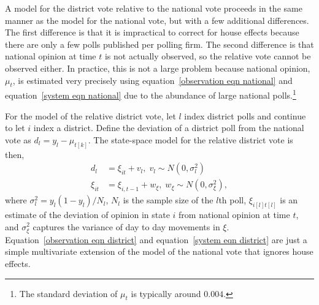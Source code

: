 \documentclass[12pt,final,fleqn]{article}
\theoremstyle{plain}
\begin{document}
A model for the district vote relative to the national vote proceeds in the same manner as the model for the national vote, but with a few additional differences. The first difference is that it is impractical to correct for house effects because there are only a few polls published per polling firm. The second difference is that national opinion at time $t$ is not actually observed, so the relative vote cannot be observed either. In practice, this is not a large problem because national opinion, $\mu_t$, is estimated very precisely using equation~\ref{observation eqn national} and equation~\ref{system eqn national} due to the abundance of large national polls.\footnote{The standard deviation of $\mu_t$ is typically around $0.004$.}

For the model of the relative district vote, let $l$ index district polls and continue to let $i$ index a district. Define the deviation of a district poll from the national vote as $d_l = y_l - \mu_{t[k]}$. The state-space model for the relative district vote is then,
\begin{align}
\label{observation eqn district}
d_l &= \xi_{it} + v_l, \; v_l\sim N(0, \sigma^2_l)\\ 
\label{system eqn district}
\xi_{it} &= \xi_{i,t-1} + w_\xi, \; w_\xi \sim N(0, \sigma^2_{\xi}), 
\end{align}
where $\sigma^2_l = y_l(1-y_l)/N_l$, $N_l$ is the sample size of the $l$th poll, $\xi_{i[l]t[l]}$ is an estimate of the deviation of opinion in state $i$ from national opinion at time $t$, and $\sigma^2_{\xi}$ captures the variance of day to day movements in $\xi$. Equation~\ref{observation eqn district} and equation~\ref{system eqn district} are just a simple multivariate extension of the model of the national vote that ignores house effects.
\end{document}
